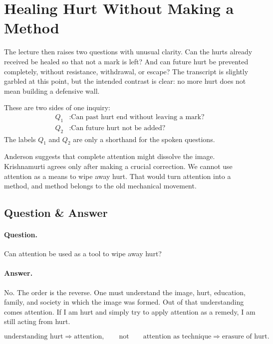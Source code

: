 \section{Healing Hurt Without Making a Method}

The lecture then raises two questions with unusual clarity. Can the hurts already received be healed so that not a mark is left? And can future hurt be prevented completely, without resistance, withdrawal, or escape? The transcript is slightly garbled at this point, but the intended contrast is clear: no more hurt does not mean building a defensive wall.

These are two sides of one inquiry:
\begin{align}
Q_1 &: \text{Can past hurt end without leaving a mark?}\\
Q_2 &: \text{Can future hurt not be added?}
\end{align}
The labels \(Q_1\) and \(Q_2\) are only a shorthand for the spoken questions.

Anderson suggests that complete attention might dissolve the image. Krishnamurti agrees only after making a crucial correction. We cannot use attention as a means to wipe away hurt. That would turn attention into a method, and method belongs to the old mechanical movement.

\subsection{Question \& Answer}

\paragraph{Question.}
Can attention be used as a tool to wipe away hurt?

\paragraph{Answer.}
No. The order is the reverse. One must understand the image, hurt, education, family, and society in which the image was formed. Out of that understanding comes attention. If I am hurt and simply try to apply attention as a remedy, I am still acting from hurt.

\begin{equation}
\text{understanding hurt}
\Rightarrow
\text{attention},
\qquad
\text{not}
\qquad
\text{attention as technique}
\Rightarrow
\text{erasure of hurt}.
\end{equation}

